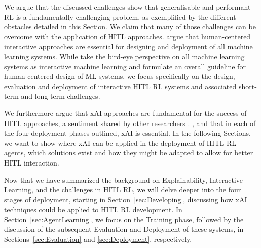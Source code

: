 \documentclass[twoside,11pt]{article}
\begin{document}
We argue that the discussed challenges show that generalisable and performant RL is a fundamentally challenging problem, as exemplified by the different obstacles detailed in this Section. We claim that many of those challenges can be overcome with the application of HITL approaches. 
 \citet{MatthewsonPilarski:2022:DesigningAndEvaluatingHCIML} argue that human-centered interactive approaches are essential for designing and deployment of all machine learning systems. While \citet{MatthewsonPilarski:2022:DesigningAndEvaluatingHCIML} take the bird-eye perspective on all machine learning systems as interactive machine learning and formulate an overall guideline for human-centered design of ML systems, we focus specifically on the design, evaluation and deployment of interactive HITL RL systems and associated short-term and long-term challenges.

We furthermore argue that xAI approaches are fundamental for the success of HITL approaches, a sentiment shared by other researchers \citep{heuillet2021explainability,milani2022survey}. , and that in each of the four deployment phases outlined, xAI is essential. In the following Sections, we want to show where xAI can be applied in the deployment of HITL RL agents, which solutions exist and how they might be adapted to allow for better HITL interaction.

Now that we have summarized the background on Explainability, Interactive Learning, and the challenges in HITL RL, we will delve deeper into the four stages of deployment, starting in Section~\ref{sec:Developing}, discussing how xAI techniques could be applied to HITL RL development. In Section~\ref{sec:AgentLearning}, we focus on the Training phase, followed by the discussion of the subsequent Evaluation and Deployment of these systems, in Sections~\ref{sec:Evaluation} and \ref{sec:Deployment}, respectively.

\end{document}
